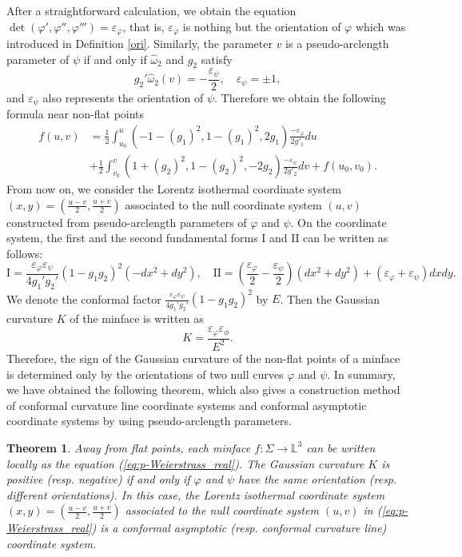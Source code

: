 \documentclass[11pt,reqno]{amsart}
\theoremstyle{plain} %
\newtheorem{theorem}{Theorem}[section]
\theoremstyle{definition}
\begin{document}
After a straightforward calculation, we obtain the equation $\det(\varphi', \varphi'', \varphi''')=\varepsilon_\varphi$, that is, $\varepsilon_\varphi$ is nothing but the orientation of $\varphi$ which was introduced in Definition \ref{ori}. Similarly, the parameter $v$ is a pseudo-arclength parameter of $\psi$ if and only if $\hat{\omega}_2$ and $g_2$ satisfy 
\begin{equation*}\label{eq:pseudo-arc-psi}
g_2'\hat{\omega}_2(v)=-\frac{\varepsilon_\psi}{2},\quad \varepsilon_\psi=\pm1,
\end{equation*}
and $\varepsilon_\psi$ also represents the orientation of $\psi$. Therefore we obtain the following formula near non-flat points
\begin{align}\label{eq:p-Weierstrass_real}
  f(u,v)
  &=\frac{1}{2}\int^u_{u_0}\left( -1-(g_1)^2, 1-(g_1)^2, 2g_1 \right)\frac{-\varepsilon_\varphi}{2g'_1}du \nonumber\\
  &+\frac{1}{2}\int^v_{v_0}\left( 1+(g_2)^2, 1-(g_2)^2, -2g_2 \right)\frac{-\varepsilon_\psi}{2g'_2}dv  
    +f(u_0,v_0).
\end{align}
From now on, we consider the Lorentz isothermal coordinate system $(x, y)=(\frac{u-v}{2}, \frac{u+v}{2})$ associated to the null coordinate system $(u, v)$ constructed from pseudo-arclength parameters of $\varphi$ and $\psi$. On the coordinate system, the first and the second fundamental forms $\mathrm{I}$ and $\mathrm{II}$ can be written as follows:
\begin{equation*}\label{eq:I and II}
\mathrm{I} =  \frac{\varepsilon_\varphi \varepsilon_\psi}{4g_1'g_2'}(1-g_1g_2)^2(-dx^2+dy^2), \quad \mathrm{II} =(\frac{\varepsilon_\varphi}{2}-\frac{\varepsilon_\psi}{2})(dx^2+dy^2)+(\varepsilon_\varphi+\varepsilon_\psi)dxdy.
\end{equation*}
We denote the conformal factor $\frac{\varepsilon_\varphi \varepsilon_\psi}{4g_1'g_2'}(1-g_1g_2)^2$ by $E$. Then the Gaussian curvature $K$ of the minface is written as
\begin{equation}\label{eq:Gauss}
K=\frac{\varepsilon_\varphi \varepsilon_\phi}{E^2}.
\end{equation}
Therefore, the sign of the Gaussian curvature of the non-flat points of a minface is determined only by the orientations of two null curves $\varphi$ and $\psi$. In summary, we have obtained the following theorem, which also gives a construction method of conformal curvature line coordinate systems and conformal asymptotic coordinate systems by using pseudo-arclength parameters. 
\begin{theorem}\label{theorem:p-Weierstrass_real}
Away from flat points, each minface $f : \Sigma \rightarrow \mathbb{L}^3$ can be written locally as the equation (\ref{eq:p-Weierstrass_real}). The Gaussian curvature $K$ is positive (resp. negative) if and only if $\varphi$ and $\psi$ have the same orientation (resp. different orientations). In this case, the Lorentz isothermal coordinate system $(x, y)=(\frac{u-v}{2}, \frac{u+v}{2})$ associated to the null coordinate system $(u, v)$ in (\ref{eq:p-Weierstrass_real}) is a conformal asymptotic (resp. conformal curvature line) coordinate system.
\end{theorem}
\end{document}
